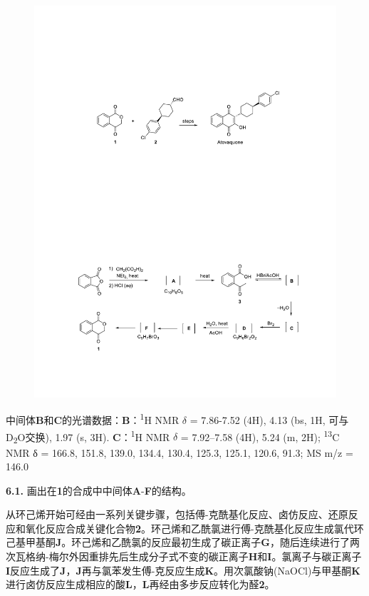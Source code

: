 \begin{figure}[h]
	\centering
	\includegraphics[width=16cm]{./pic/t6-2.pdf}
\end{figure}

中间体\textbf{B}和\textbf{C}的光谱数据：\textbf{B}：\textsuperscript{1}H NMR $\delta$ = 7.86-7.52 (4H), 4.13 (bs, 1H, 可与D\textsubscript{2}O交换), 1.97 (s, 3H). \textbf{C}：\textsuperscript{1}H NMR $δ$ = 7.92--7.58 (4H), 5.24 (m, 2H); \textsuperscript{13}C NMR δ = 166.8, 151.8, 139.0, 134.4, 130.4, 125.3, 125.1, 120.6, 91.3; MS m/z = 146.0

\noindent\textbf{6.1.} 画出在\textbf{1}的合成中中间体\textbf{A}-\textbf{F}的结构。

从环己烯开始可经由一系列关键步骤，包括傅-克酰基化反应、卤仿反应、还原反应和氧化反应合成关键化合物\textbf{2}。环己烯和乙酰氯进行傅-克酰基化反应生成氯代环己基甲基酮\textbf{J}。环己烯和乙酰氯的反应最初生成了碳正离子\textbf{G}，随后连续进行了两次瓦格纳-梅尔外因重排先后生成分子式不变的碳正离子\textbf{H}和\textbf{I}。氯离子与碳正离子\textbf{I}反应生成了\textbf{J}，\textbf{J}再与氯苯发生傅-克反应生成\textbf{K}。用次氯酸钠(NaOCl)与甲基酮\textbf{K}进行卤仿反应生成相应的酸\textbf{L}，\textbf{L}再经由多步反应转化为醛\textbf{2}。


